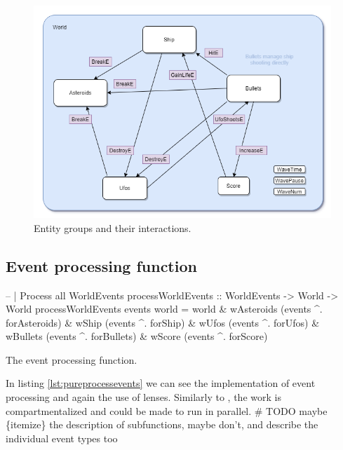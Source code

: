 \documentclass[
  digital, %
  color,   %
  table,   %
  oneside, %
  lof,     %
  lot,     %
]{fithesis3}
\begin{document}
{%
\begin{figure}
    \centering
    \includegraphics[width=\textwidth]{images/entity-relationships-transparent-bg.png}
    \caption{Entity groups and their interactions.}
    \label{fig:entitygroups}
\end{figure}


\subsection{Event processing function}

\begin{listing}
\begin{haskell}
-- | Process all WorldEvents
processWorldEvents :: WorldEvents -> World -> World
processWorldEvents events world =
    world
      & wAsteroids %
                        (events ^. forAsteroids)
      & wShip      %
                        (events ^. forShip)
      & wUfos      %
                        (events ^. forUfos)
      & wBullets   %
                        (events ^. forBullets)
      & wScore     %
                        (events ^. forScore)
\end{haskell}
\caption{The event processing function.}
\label{lst:pureprocessevents}
\end{listing}

In listing \ref{lst:pureprocessevents} we can see the implementation of
event processing and again the use of lenses.
Similarly to , the work is compartmentalized
and could be made to run in parallel.
\# TODO maybe \{itemize\} the description of subfunctions,
maybe don't, and describe the individual event types too


}
\end{document}
